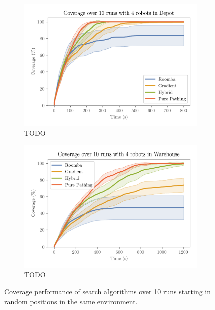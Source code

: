 \begin{figure}[H]
  \centering
  \begin{subfigure}[b]{0.49\textwidth}
    \centering
    \includegraphics[width=\textwidth]{./figures/plots/benchmarks/coverage-over-10-runs-with-4-robots-in-depot.png}
    \caption{TODO}
  \end{subfigure}
  \begin{subfigure}[b]{0.49\textwidth}
    \centering
    \includegraphics[width=\textwidth]{./figures/plots/benchmarks/coverage-over-10-runs-with-4-robots-in-warehouse.png}
    \caption{TODO}
  \end{subfigure}
    \caption{Coverage performance of search algorithms over 10 runs starting in random positions in the same environment.}
    \label{fig:coverage-benchmark}
\end{figure}

